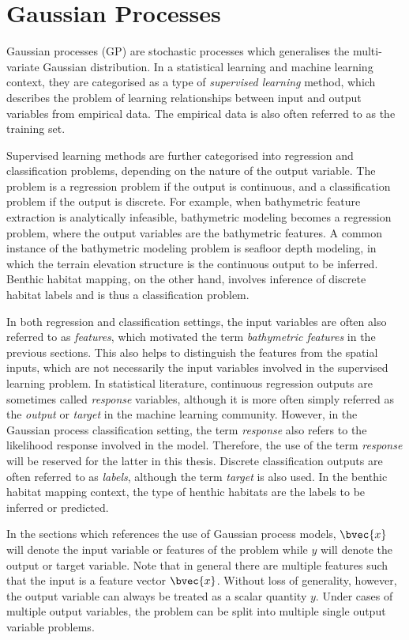 	\section{Gaussian Processes}
	
		Gaussian processes (GP) are stochastic processes which generalises the multi-variate Gaussian distribution. In a statistical learning and machine learning context, they are categorised as a type of \textit{supervised learning} method, which describes the problem of learning relationships between input and output variables from empirical data. The empirical data is also often referred to as the training set.
		
		Supervised learning methods are further categorised into regression and classification problems, depending on the nature of the output variable. The problem is a regression problem if the output is continuous, and a classification problem if the output is discrete. For example, when bathymetric feature extraction is analytically infeasible, bathymetric modeling becomes a regression problem, where the output variables are the bathymetric features. A common instance of the bathymetric modeling problem is seafloor depth modeling, in which the terrain elevation structure is the continuous output to be inferred. Benthic habitat mapping, on the other hand, involves inference of discrete habitat labels and is thus a classification problem.
		
		In both regression and classification settings, the input variables are often also referred to as \textit{features}, which motivated the term \textit{bathymetric features} in the previous sections. This also helps to distinguish the features from the spatial inputs, which are not necessarily the input variables involved in the supervised learning problem. In statistical literature, continuous regression outputs are sometimes called \textit{response} variables, although it is more often simply referred as the \textit{output} or \textit{target} in the machine learning community. However, in the Gaussian process classification setting, the term \textit{response} also refers to the likelihood response involved in the model. Therefore, the use of the term \textit{response} will be reserved for the latter in this thesis. Discrete classification outputs are often referred to as \textit{labels}, although the term \textit{target} is also used. In the benthic habitat mapping context, the type of henthic habitats are the labels to be inferred or predicted. 
		
		In the sections which references the use of Gaussian process models, $\bvec{x}$ will denote the input variable or features of the problem while $y$ will denote the output or target variable. Note that in general there are multiple features such that the input is a feature vector $\bvec{x}$. Without loss of generality, however, the output variable can always be treated as a scalar quantity $y$. Under cases of multiple output variables, the problem can be split into multiple single output variable problems.
		
